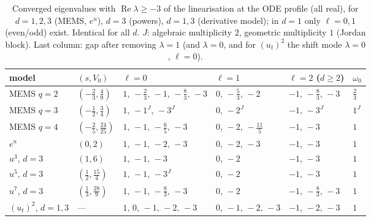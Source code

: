 \begin{table}[ht]
\centering\small
\begin{tabular}{@{}llllll@{}}
\toprule
model & $(s,V_0)$ & $\ell=0$ & $\ell=1$ & $\ell=2$ ($d\ge2$) & $\omega_0$\\
\midrule
MEMS $q=2$ & $(-\frac23,\frac49)$ & $1,\,-\frac23,\,-1,\,-\frac83,\,-3$ & $0,\,-\frac53,\,-2$ & $-1,\,-\frac83,\,-3$ & $\frac23$\\
MEMS $q=3$ & $(-\frac12,\frac34)$ & $1,\,-1^{J},\,-3^{J}$ & $0,\,-2^{J}$ & $-1,\,-3^{J}$ & $1^{J}$\\
MEMS $q=4$ & $(-\frac25,\frac{24}{25})$ & $1,\,-1,\,-\frac65,\,-3$ & $0,\,-2,\,-\frac{11}5$ & $-1,\,-3$ & $1$\\
$e^u$ & $(0,2)$ & $1,\,-1,\,-2,\,-3$ & $0,\,-2,\,-3$ & $-1,\,-3$ & $1$\\
$u^3$, $d=3$ & $(1,6)$ & $1,\,-1,\,-3$ & $0,\,-2$ & $-1,\,-3$ & $1$\\
$u^5$, $d=3$ & $(\frac12,\frac{15}4)$ & $1,\,-1,\,-3^{J}$ & $0,\,-2$ & $-1,\,-3$ & $1$\\
$u^7$, $d=3$ & $(\frac13,\frac{28}9)$ & $1,\,-1,\,-\frac83,\,-3$ & $0,\,-2$ & $-1,\,-\frac83,\,-3$ & $1$\\
$(u_t)^2$, $d=1,3$ & --- & $1,\,0,\,-1,\,-2,\,-3$ & $0,\,-1,\,-2,\,-3$ & $-1,\,-2,\,-3$ & $1$\\
\bottomrule
\end{tabular}
\caption{Converged eigenvalues with $\operatorname{Re}\lambda\ge-3$ of the
linearisation at the ODE profile (all real), for $d=1,2,3$ (MEMS, $e^u$), $d=3$
(powers), $d=1,3$ (derivative model); in $d=1$ only $\ell=0,1$ (even/odd)
exist. Identical for all $d$. $J$: algebraic multiplicity $2$, geometric
multiplicity $1$ (Jordan block). Last column: gap after removing $\lambda=1$
(and $\lambda=0$, and for $(u_t)^2$ the shift mode $\lambda=0$, $\ell=0$).}
\label{num:tab-spec}
\end{table}

